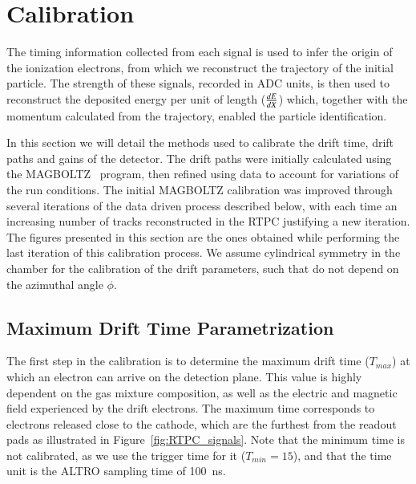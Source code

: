 \documentclass[preprint,5p]{elsarticle}
\begin{document}
\section{Calibration} \label{sec_calib}

The timing information collected from each signal is used 
to infer the origin of the ionization electrons, from which we
reconstruct the trajectory of the initial particle. The strength of these 
signals, recorded in ADC units, is then used to reconstruct 
the deposited energy per unit of length ($\small{\frac{dE}{dX}}$) which, 
together with the momentum calculated from the trajectory, enabled the particle 
identification. 

In this section we will detail the methods used to calibrate the drift time,
drift paths and gains of the detector. The drift paths were initially
calculated using the MAGBOLTZ~\cite{Biagi:1999nwa} program, then refined using
data to account for variations of the run conditions. The initial MAGBOLTZ
calibration was improved through several iterations of the
data driven process described below, with each time an increasing number of tracks 
reconstructed in the RTPC justifying a new iteration. The figures presented in this section
are the ones obtained while performing the last iteration of this
calibration process. We assume 
cylindrical symmetry in the chamber for the calibration of the drift parameters, 
such that do not depend on the azimuthal angle $\phi$.

\subsection{Maximum Drift Time Parametrization}

The first step in the calibration is to determine the maximum drift time ($T_{max}$) at which an
electron can arrive on the detection plane. This value is highly dependent on the gas 
mixture composition, as well as the electric and magnetic field experienced by the drift 
electrons. The maximum time corresponds to electrons released close to 
the cathode, which are the furthest from the readout pads as illustrated in 
Figure~\ref{fig:RTPC_signals}. Note that the minimum time is not calibrated, as we
use the trigger time for it ($T_{min}=15$), and that the time unit is the ALTRO 
sampling time of 100~ns.
\end{document}
